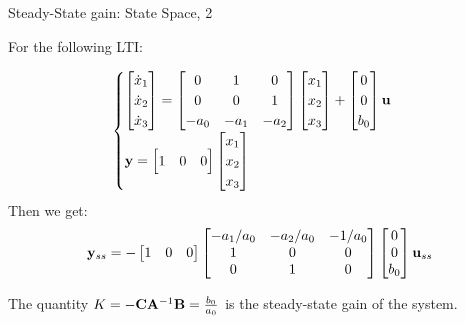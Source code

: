 \documentclass{beamer}
\begin{document}
\begin{frame}{Steady-State gain: State Space, 2}
	\begin{flushleft}
		
		For the following LTI:
		
		\begin{equation}
			\begin{cases}
			\begin{bmatrix}
				\dot{x}_1 \\ \dot{x}_2 \\ \dot{x}_3
			\end{bmatrix} 
			=
			\begin{bmatrix}
				0 & 1 & 0 \\ 
				0 & 0 & 1 \\
				-a_0 & -a_1 & -a_2
			\end{bmatrix} 
			\begin{bmatrix}
				x_1 \\ x_2 \\ x_3
			\end{bmatrix} 
			+ 
			\begin{bmatrix}
				0 \\ 0 \\ b_0
			\end{bmatrix}
			\mathbf{u}
			\\
			\mathbf{y} = 			
			\begin{bmatrix}
				1 & 0 & 0
			\end{bmatrix}
			\begin{bmatrix}
			x_1 \\ x_2 \\ x_3
			\end{bmatrix} 
		\end{cases}
		\end{equation}
		Then we get:
		\begin{equation}
			\mathbf{y}_{ss} = 
			-\begin{bmatrix}
				1 & 0 & 0
			\end{bmatrix}
			\begin{bmatrix}
				-a_1 / a_0 & -a_2 / a_0 & -1 / a_0 \\
				1 & 0 & 0 \\
				0 & 1 & 0
			\end{bmatrix}
			\begin{bmatrix}
				0 \\ 0 \\ b_0
			\end{bmatrix}
			\mathbf{u}_{ss}
		\end{equation}
		
		
		The quantity $K =-\mathbf{C} \mathbf{A}^{-1}\mathbf{B} = \frac{b_0}{a_0}$ is the steady-state gain of the system.
		
	\end{flushleft}
\end{frame}
\end{document}

